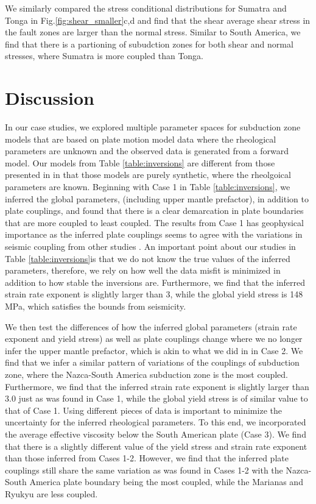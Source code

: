\documentclass[12pt]{article}
\newcommand{\vrnote}[1]{\textcolor{red}{VR: #1}}
\begin{document}
We similarly compared the stress conditional distributions for Sumatra and Tonga in Fig.\ref{fig:shear_smaller}c,d and find that the shear average shear stress in the fault zones are larger than the normal stress. Similar to South America, we find that there is a partioning of subudction zones for both shear and normal stresses, where Sumatra is more coupled than Tonga.


\section{Discussion}
In our case studies, we explored multiple parameter spaces for subduction zone models that are based on plate motion model data where the rheological parameters are unknown and the observed data is generated from a forward model. Our models from Table \ref{table:inversions} are different from those presented in \citep{ratnaswamy2015adjoint} in that those models are purely synthetic, where the rheolgoical parameters are known. Beginning with Case 1 in Table \ref{table:inversions}, we inferred the global parameters, (including upper mantle prefactor), in addition to plate couplings, and found that there is a clear demarcation in plate boundaries that are more coupled to least coupled. The results from Case 1 has geophysical importance as the inferred plate couplings seems to agree with the variations in seismic coupling from other studies \citep{scholz1995mechanism}.  An important point about our studies in Table \ref{table:inversions}is that we do not know the true values of the inferred parameters, therefore, we rely on how well the data misfit is minimized in addition to how stable the inversions are. Furthermore, we find that the inferred strain rate exponent is slightly larger than 3, while the global yield stress is 148 MPa, which satisfies the bounds from seismicity.

We then test the differences of how the inferred global parameters (strain rate exponent and yield stress) as well as plate couplings change where we no longer infer the upper mantle prefactor, which is akin to what we did in \citep{ratnaswamy2015adjoint} in Case 2. We find that we infer a similar pattern of variations of the couplings of subduction zone, where the Nazca-South America subduction zone is the most coupled. Furthermore, we find that the inferred strain rate exponent is slightly larger than 3.0 just as was found in Case 1, while the global yield stress is of similar value to that of Case 1. Using different pieces of data is important to minimize the uncertainty for the inferred rheological parameters. To this end, we incorporated the average effective viscosity below the South American plate (Case 3).  We find that there is a slightly different value of the yield stress and strain rate exponent than those inferred from Cases 1-2. However, we find that the inferred plate couplings still share the same variation as was found in Cases 1-2 with the Nazca-South America plate boundary being the most coupled, while the Marianas and Ryukyu are less coupled.
\end{document}

